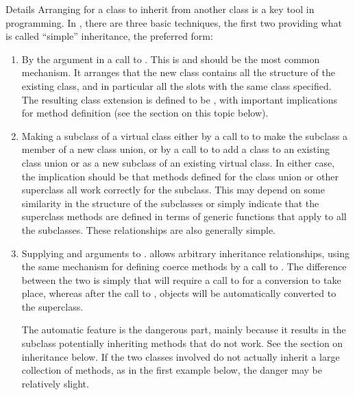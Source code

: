 \begin{Section}{Details}
Arranging for a class to inherit from another class is a key tool in
programming.  In \R{}, there are three basic techniques, the first two
providing what is called  ``simple'' inheritance, the preferred form:

\begin{enumerate}

\item 
By the  argument in a call to .  This
is and should be the most common mechanism.  It arranges that the new
class contains all the structure of the existing class, and in
particular all the slots with the same class specified.  The
resulting class extension is defined to be , with
important implications for method definition (see the section on
this topic below).

\item 
Making  a subclass of a virtual class
either by a call to  to make the
subclass a member of a new class union, or by a call to
 to add a class to an existing class union or as a new
subclass of an existing virtual class.  In either case, the
implication should be that methods defined for the class union or
other superclass all work correctly for the subclass.  This may
depend on some similarity in the structure of the subclasses or
simply indicate that the superclass methods are defined in terms
of generic functions that apply to all the subclasses.  These
relationships are also generally simple.


\item 
Supplying   and  arguments to .
\R{} allows arbitrary inheritance relationships, using the same
mechanism for defining coerce methods by a call to
.  The difference between the  two is simply
that  will require a call to 
for a conversion to take place, whereas after the call to
, objects will be automatically converted to
the superclass.

The automatic feature is the dangerous part, mainly because it
results in the subclass potentially inheriting methods that do
not work.  See the section on inheritance below.  If the two
classes involved do not actually inherit a large collection of
methods, as in the first example below, the danger may be
relatively slight.


\end{enumerate}
\end{Section}
